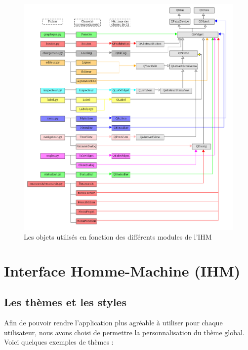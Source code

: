 \documentclass[a4paper,12pt]{article}
\begin{document}
	\begin{figure}[h!]
		\begin{center}
			\includegraphics[scale=0.46]{images/imgs_uml/new_relation_Qt.png}
				\caption{Les objets utilisés en fonction des différents modules de l'IHM}
		\end{center}
	\end{figure}
		
\newpage

\section{Interface Homme-Machine (IHM)}
		
	\subsection{Les thèmes et les styles}
	
	Afin de pouvoir rendre l'application plus agréable à utiliser pour chaque utilisateur, nous avons choisi de permettre la personnalisation du thème global.
	Voici quelques exemples de thèmes : 
	
\end{document}
